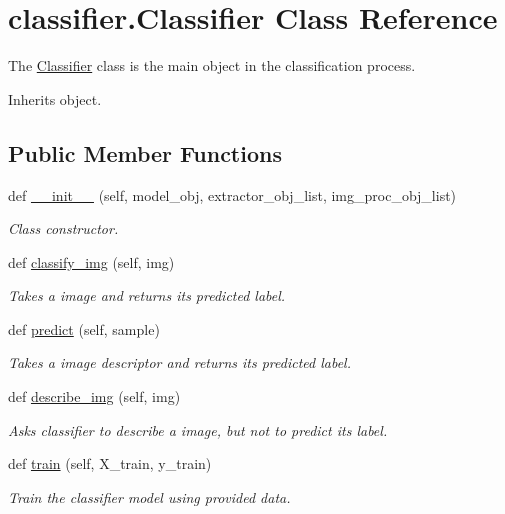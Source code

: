 \hypertarget{classclassifier_1_1_classifier}{}\section{classifier.\+Classifier Class Reference}
\label{classclassifier_1_1_classifier}


The \mbox{\hyperlink{classclassifier_1_1_classifier}{Classifier}} class is the main object in the classification process.  




Inherits object.

\subsection*{Public Member Functions}
\begin{DoxyCompactItemize}
\item 
def \mbox{\hyperlink{classclassifier_1_1_classifier_afe3f298d174edc880684ba282cf69785}{\+\_\+\+\_\+init\+\_\+\+\_\+}} (self, model\+\_\+obj, extractor\+\_\+obj\+\_\+list, img\+\_\+proc\+\_\+obj\+\_\+list)
\begin{DoxyCompactList}\small\item\em Class constructor. \end{DoxyCompactList}\item 
def \mbox{\hyperlink{classclassifier_1_1_classifier_ab5738cbcf0446b4b0432022e456f940e}{classify\+\_\+img}} (self, img)
\begin{DoxyCompactList}\small\item\em Takes a image and returns it\textquotesingle{}s predicted label. \end{DoxyCompactList}\item 
def \mbox{\hyperlink{classclassifier_1_1_classifier_aec9c4f80b858660a2ac85226e56670a1}{predict}} (self, sample)
\begin{DoxyCompactList}\small\item\em Takes a image descriptor and returns it\textquotesingle{}s predicted label. \end{DoxyCompactList}\item 
def \mbox{\hyperlink{classclassifier_1_1_classifier_af8f6cb74f105de67966fed3bece2c77b}{describe\+\_\+img}} (self, img)
\begin{DoxyCompactList}\small\item\em Asks classifier to describe a image, but not to predict it\textquotesingle{}s label. \end{DoxyCompactList}\item 
def \mbox{\hyperlink{classclassifier_1_1_classifier_a6113499eedf79694730f3bbb36958aee}{train}} (self, X\+\_\+train, y\+\_\+train)
\begin{DoxyCompactList}\small\item\em Train the classifier model using provided data. \end{DoxyCompactList}\end{DoxyCompactItemize}
